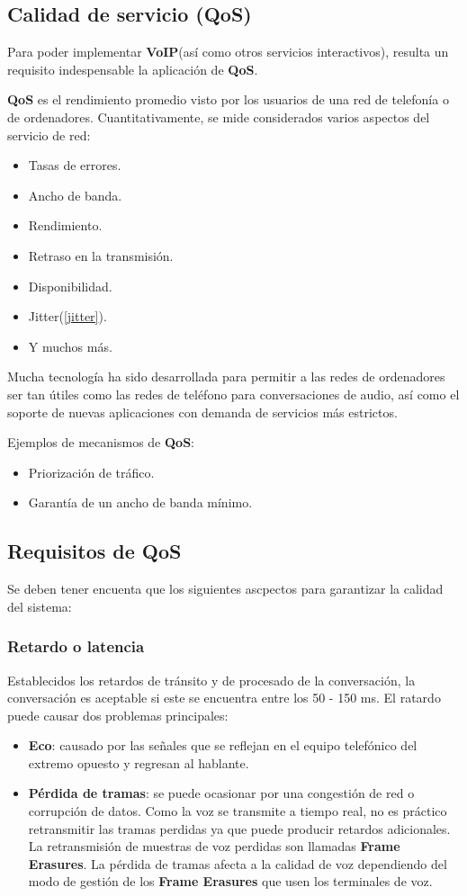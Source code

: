 \documentclass[a4paper, 11pt]{article} %
\begin{document}
		\subsection{Calidad de servicio (QoS)}
		Para poder implementar \textbf{VoIP}(así como otros servicios interactivos), resulta un requisito indespensable la aplicación de \textbf{QoS}.
		
		\textbf{QoS} es el rendimiento promedio visto por los usuarios de una red de telefonía o de ordenadores. Cuantitativamente, se mide considerados varios aspectos del servicio de red:
		\begin{itemize}
			\item Tasas de errores.
			\item Ancho de banda.
			\item Rendimiento.
			\item Retraso en la transmisión.
			\item Disponibilidad.
			\item Jitter(\ref{jitter}).
			\item Y muchos más.
		\end{itemize}
		
		Mucha tecnología ha sido desarrollada para permitir a las redes de ordenadores ser tan útiles como las redes de teléfono para conversaciones de audio, así como el soporte de nuevas aplicaciones con demanda de servicios más estrictos.
		
		Ejemplos de mecanismos de \textbf{QoS}:
		\begin{itemize}
			\item Priorización de tráfico.
			\item Garantía de un ancho de banda mínimo.
		\end{itemize}
	
	\subsection{Requisitos de QoS}
	Se deben tener encuenta que los siguientes ascpectos para garantizar la calidad del sistema:
		
		\subsubsection{Retardo o latencia}
		Establecidos los retardos de tránsito y de procesado de la conversación, la conversación es aceptable si este se encuentra entre los 50 - 150 ms. 
		El ratardo puede causar dos problemas principales:
		\begin{itemize}
			\item \textbf{Eco}: causado por las señales que se reflejan en el equipo telefónico del extremo opuesto y regresan al hablante.
			\item \textbf{Pérdida de tramas}: se puede ocasionar por una congestión de red o corrupción de datos. Como la voz se transmite a tiempo real, no es práctico retransmitir las tramas perdidas ya que puede producir retardos adicionales. La retransmisión de muestras de voz perdidas son llamadas \textbf{Frame Erasures}. La pérdida de tramas afecta a la calidad de voz dependiendo del modo de gestión de los \textbf{Frame Erasures} que usen los terminales de voz.
		\end{itemize}
		
\end{document}
